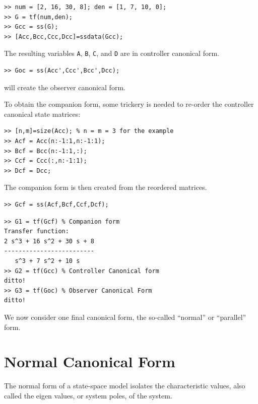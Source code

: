 \begin{slide}\label{slide:l5s10}
\begin{verbatim}
>> num = [2, 16, 30, 8]; den = [1, 7, 10, 0];
>> G = tf(num,den);
>> Gcc = ss(G);
>> [Acc,Bcc,Ccc,Dcc]=ssdata(Gcc);
\end{verbatim}
The resulting variables \verb|A|, \verb|B|, \verb|C|, and \verb|D|
are in controller canonical form.
\begin{verbatim}
>> Goc = ss(Acc',Ccc',Bcc',Dcc);
\end{verbatim}
will create the observer canonical form.
\end{slide}
\begin{slide}\label{slide:15s10a}
To obtain the companion form,
some \Matlab{} trickery is needed to re-order the controller
canonical state matrices:
\begin{verbatim}
>> [n,m]=size(Acc); % n = m = 3 for the example
>> Acf = Acc(n:-1:1,n:-1:1);
>> Bcf = Bcc(n:-1:1,:);
>> Ccf = Ccc(:,n:-1:1);
>> Dcf = Dcc;
\end{verbatim}
The companion form is then created from the reordered matrices.
\begin{verbatim}
>> Gcf = ss(Acf,Bcf,Ccf,Dcf);
\end{verbatim}
\end{slide}
\begin{slide}\label{slide:l5s11}
\begin{verbatim}
>> G1 = tf(Gcf) % Companion form
Transfer function:
2 s^3 + 16 s^2 + 30 s + 8
-------------------------
   s^3 + 7 s^2 + 10 s
>> G2 = tf(Gcc) % Controller Canonical form
ditto!
>> G3 = tf(Goc) % Observer Canonical Form
ditto!
\end{verbatim}
\end{slide}
We now consider one
final canonical form, the so-called ``normal'' or ``parallel''
form.

\section*{Normal Canonical Form}
\ifslidesonly
\begin{slide}
\end{slide}
\fi
The normal form of
a state-space model isolates the characteristic values, also
called the eigen values, or system poles, of the system.

